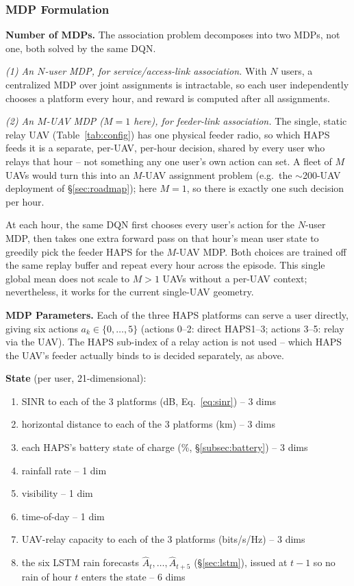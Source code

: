 \documentclass[]{ieeeaccess}
\begin{document}
\subsubsection{MDP Formulation}

\textbf{Number of MDPs.} The association problem decomposes into two MDPs, not one, both solved by the same DQN.

\emph{(1) An $N$-user MDP, for service/access-link association.} With $N$ users, a centralized MDP over joint assignments is intractable, so each user independently chooses a platform every hour, and reward is computed after all assignments.

\emph{(2) An $M$-UAV MDP ($M=1$ here), for feeder-link association.} The single, static relay UAV (Table~\ref{tab:config}) has one physical feeder radio, so which HAPS feeds it is a separate, per-UAV, per-hour decision, shared by every user who relays that hour -- not something any one user's own action can set. A fleet of $M$ UAVs would turn this into an $M$-UAV assignment problem (e.g.\ the $\sim$200-UAV deployment of \S\ref{sec:roadmap}); here $M=1$, so there is exactly one such decision per hour.

At each hour, the same DQN first chooses every user's action for the $N$-user MDP, then takes one extra forward pass on that hour's mean user state to greedily pick the feeder HAPS for the $M$-UAV MDP. Both choices are trained off the same replay buffer and repeat every hour across the episode. This single global mean does not scale to $M>1$ UAVs without a per-UAV context; nevertheless, it works for the current single-UAV geometry.

\textbf{MDP Parameters.} Each of the three HAPS platforms can serve a user directly, giving six actions $a_k\in\{0,\dots,5\}$ (actions 0--2: direct HAPS1--3; actions 3--5: relay via the UAV). The HAPS sub-index of a relay action is not used -- which HAPS the UAV's feeder actually binds to is decided separately, as above.

\textbf{State} (per user, 21-dimensional):
\begin{enumerate}\setlength{\itemsep}{1pt}
  \item SINR to each of the 3 platforms (dB, Eq.~\eqref{eq:sinr}) -- 3 dims
  \item horizontal distance to each of the 3 platforms (km) -- 3 dims
  \item each HAPS's battery state of charge (\%, \S\ref{subsec:battery}) -- 3 dims
  \item rainfall rate -- 1 dim
  \item visibility -- 1 dim
  \item time-of-day -- 1 dim
  \item UAV-relay capacity to each of the 3 platforms (bits/s/Hz) -- 3 dims
  \item the six LSTM rain forecasts $\hat{A}_t,\dots,\hat{A}_{t+5}$ (\S\ref{sec:lstm}), issued at $t-1$ so no rain of hour $t$ enters the state -- 6 dims
\end{enumerate}
\end{document}
